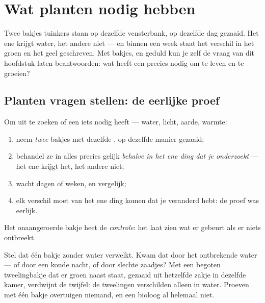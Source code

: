 \chapter{Wat planten nodig hebben}\label{ch:g4:what-plants-need}

Twee bakjes tuinkers staan op dezelfde vensterbank, op dezelfde dag
gezaaid. Het ene krijgt water, het andere niet --- en binnen een week
staat het verschil in het groen en het geel geschreven. Met bakjes,
 en geduld kun je  zelf de vraag van dit hoofdstuk laten
beantwoorden: wat heeft een  precies nodig om te leven en te groeien?

\section{Planten vragen stellen: de eerlijke proef}

\begin{method}\label{met:g4:what-plants-need:fairtest}
Om uit te zoeken of een  iets nodig heeft --- water, licht, aarde,
warmte:
\begin{enumerate}
  \item neem \emph{twee} bakjes met dezelfde , op dezelfde
        manier gezaaid;
  \item behandel ze in alles precies gelijk \emph{behalve in het ene
        ding dat je onderzoekt} --- het ene krijgt het, het andere niet;
  \item wacht dagen of weken, en vergelijk;
  \item elk verschil moet van het ene ding komen dat je veranderd hebt:
        de proef was eerlijk.
\end{enumerate}
Het onaangeroerde bakje heet de \emph{controle}: het laat zien wat er gebeurt als er niets ontbreekt.
\end{method}

\begin{example}\label{ex:g4:what-plants-need:control}
Stel dat één bakje zonder water verwelkt. Kwam dat door het ontbrekende
water --- of door een koude nacht, of door slechte zaadjes? Met een
begoten tweelingbakje dat er groen naast staat, gezaaid uit hetzelfde
zakje in dezelfde kamer, verdwijnt de twijfel: de tweelingen
verschilden alleen in water. Proeven met één bakje overtuigen niemand,
en een bioloog al helemaal niet.
\end{example}


